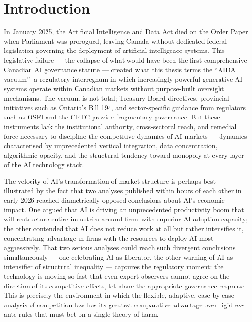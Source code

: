 
\section{Introduction}

In January 2025, the Artificial Intelligence and Data Act died on the Order Paper when Parliament was prorogued, leaving Canada without dedicated federal legislation governing the deployment of artificial intelligence systems. This legislative failure --- the collapse of what would have been the first comprehensive Canadian AI governance statute --- created what this thesis terms the ``AIDA vacuum'': a regulatory interregnum in which increasingly powerful generative AI systems operate within Canadian markets without purpose-built oversight mechanisms. The vacuum is not total; Treasury Board directives, provincial initiatives such as Ontario's Bill 194, and sector-specific guidance from regulators such as OSFI and the CRTC provide fragmentary governance. But these instruments lack the institutional authority, cross-sectoral reach, and remedial force necessary to discipline the competitive dynamics of AI markets --- dynamics characterised by unprecedented vertical integration, data concentration, algorithmic opacity, and the structural tendency toward monopoly at every layer of the AI technology stack.

The velocity of AI's transformation of market structure is perhaps best illustrated by the fact that two analyses published within hours of each other in early 2026 reached diametrically opposed conclusions about AI's economic impact. One argued that AI is driving an unprecedented productivity boom that will restructure entire industries around firms with superior AI adoption capacity; the other contended that AI does not reduce work at all but rather intensifies it, concentrating advantage in firms with the resources to deploy AI most aggressively. That two serious analyses could reach such divergent conclusions simultaneously --- one celebrating AI as liberator, the other warning of AI as intensifier of structural inequality --- captures the regulatory moment: the technology is moving so fast that even expert observers cannot agree on the direction of its competitive effects, let alone the appropriate governance response. This is precisely the environment in which the flexible, adaptive, case-by-case analysis of competition law has its greatest comparative advantage over rigid ex-ante rules that must bet on a single theory of harm.

